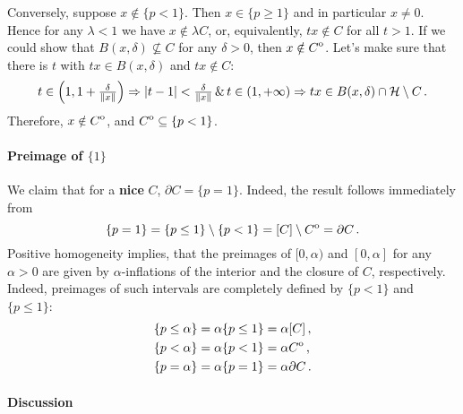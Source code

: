 \documentclass[a4paper]{article}
\newcommand{\Hcal}{\mathcal{H}}
\newcommand{\interior}[1]{%
  {\kern0pt#1}^{\mathrm{o}}%
}
\begin{document}
Conversely, suppose $x \notin \{p < 1\}$. Then $x\in \{p \geq 1\}$ and in particular
$x\neq 0$. Hence for any $\lambda < 1$ we have $x \notin \lambda C$, or, equivalently,
$t x \notin C$ for all $t > 1$. If we could show that $B(x, \delta) \not\subseteq C$
for any $\delta > 0$, then $x \notin \interior{C}$. Let's make sure that there is
$t$ with $t x \in B(x, \delta)$ and $tx \notin C$:
\begin{equation*}
  t \in\Bigl(1, 1 + \tfrac\delta{\|x\|} \Bigr)
    \Rightarrow
      \lvert t - 1\rvert < \tfrac\delta{\|x\|}
      \, \& \, t \in (1, +\infty)
    \Rightarrow
      t x \in B(x, \delta) \cap \Hcal \setminus C
      \,.
\end{equation*}
Therefore, $x \notin \interior{C}$, and $\interior{C} \subseteq \{p < 1\}$.


\paragraph{Preimage of $\{1\}$} %
\label{par:preimage_of_1}

We claim that for a {\bf nice} $C$, $\partial C = \{p = 1\}$. Indeed, the result
follows immediately from
\begin{equation}
  \{p = 1\}
    = \{p \leq 1\} \setminus \{p < 1\}
    = [C] \setminus \interior{C}
    = \partial C
    \,.
\end{equation}
Positive homogeneity implies, that the preimages of $[0, \alpha)$ and $[0, \alpha]$
for any $\alpha > 0$ are given by $\alpha$-inflations of the interior and the closure
of $C$, respectively. Indeed, preimages of such intervals are completely defined by
$\{p < 1\}$ and $\{p \leq 1\}$:
\begin{align*}
  \{p \leq \alpha \}
    &= \alpha \{p \leq 1\}
    = \alpha [C]
    \,, \\
  \{p < \alpha \}
    &= \alpha \{p < 1\}
    = \alpha \interior{C}
    \,, \\
  \{p = \alpha \}
    &= \alpha \{p = 1\}
    = \alpha \partial C
    \,.
\end{align*}


\paragraph{Discussion} %
\label{par:discussion}
\end{document}
